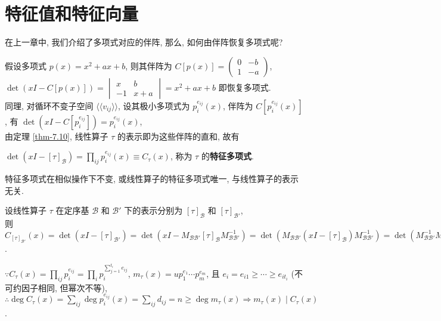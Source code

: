 \documentclass{note}
\begin{document}
\fi
\chapter{特征值和特征向量}
在上一章中, 我们介绍了多项式对应的伴阵, 那么, 如何由伴阵恢复多项式呢?

假设多项式 $p(x)=x^2+ax+b$, 则其伴阵为 $C[p(x)]=\begin{pmatrix}
    0&-b\\
    1&-a
\end{pmatrix}$,\\
$\det(xI-C[p(x)])=\begin{vmatrix}
    x&b\\
    -1&x+a
\end{vmatrix}=x^2+ax+b$ 即恢复多项式.\\
同理, 对循环不变子空间 $\langle\langle v_{ij}\rangle\rangle$, 设其极小多项式为 $p_i^{e_{ij}}(x)$, 伴阵为 $C[p_i^{e_{ij}}(x)]$, 有 $\det(xI-C[p_i^{e_{ij}}])=p_i^{e_{ij}}(x)$,\\
由定理 \ref{thm-7.10}, 线性算子 $\tau$ 的表示即为这些伴阵的直和, 故有
\begin{df}[特征多项式]
    $\det(xI-[\tau]_{\mathcal{B}})=\prod_{ij}p_i^{e_{ij}}(x)\equiv C_{\tau}(x)$, 称为 $\tau$ 的\textbf{特征多项式}.
\end{df}

\begin{thm}[(课本第 3 版 引理 7.17, 定理 7.18)]
    特征多项式在相似操作下不变, 或线性算子的特征多项式唯一, 与线性算子的表示无关.
\end{thm}
\begin{pf}
    设线性算子 $\tau$ 在定序基 $\mathcal{B}$ 和 $\mathcal{B}'$ 下的表示分别为 $[\tau]_{\mathcal{B}}$ 和 $[\tau]_{\mathcal{B}'}$,\\
    则 $C_{[\tau]_{\mathcal{B}'}}(x)=\det(xI-[\tau]_{\mathcal{B}'})=\det(xI-M_{\mathcal{BB}'}[\tau]_{\mathcal{B}}M_{\mathcal{BB}'}^{-1})=\det(M_{\mathcal{BB}'}(xI-[\tau]_{\mathcal{B}})M_{\mathcal{BB}'}^{-1})=\det(M_{\mathcal{BB}'}^{-1}M_{\mathcal{BB}'}(xI-[\tau]_{\mathcal{B}}))=\det(xI-[\tau]_{\mathcal{B}})=C_{[\tau]_{\mathcal{B}}}(x)$.
\end{pf}

$\because C_{\tau}(x)=\prod_{ij}p_i^{e_{ij}}=\prod_ip_i^{\sum_{j=1}^{t_i}e_{ij}}$, $m_{\tau}(x)=up_1^{e_1}\cdots p_m^{e_m}$, 且 $e_i=e_{i1}\geq\cdots\geq e_{it_i}$ (不可约因子相同, 但幂次不等), $\therefore\deg C_{\tau}(x)=\sum_{ij}\deg p_i^{e_{ij}}(x)=\sum_{ij}d_{ij}=n\geq\deg m_{\tau}(x)\Longrightarrow m_{\tau}(x)\mid C_{\tau}(x)$.
\end{document}
